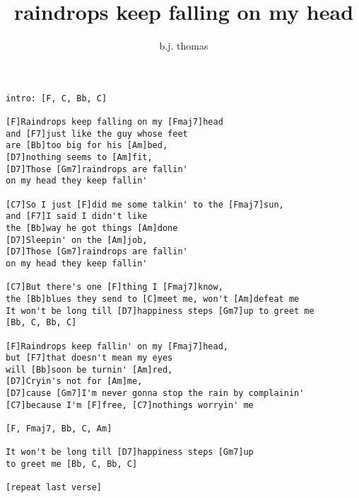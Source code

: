 \author{b.j. thomas}
\title{raindrops keep falling on my head}
\maketitle
\begin{verbatim}
intro: [F, C, Bb, C]

[F]Raindrops keep falling on my [Fmaj7]head
and [F7]just like the guy whose feet
are [Bb]too big for his [Am]bed,
[D7]nothing seems to [Am]fit,
[D7]Those [Gm7]raindrops are fallin'
on my head they keep fallin'

[C7]So I just [F]did me some talkin' to the [Fmaj7]sun,
and [F7]I said I didn't like
the [Bb]way he got things [Am]done
[D7]Sleepin' on the [Am]job,
[D7]Those [Gm7]raindrops are fallin'
on my head they keep fallin'

[C7]But there's one [F]thing I [Fmaj7]know,
the [Bb]blues they send to [C]meet me, won't [Am]defeat me
It won't be long till [D7]happiness steps [Gm7]up to greet me
[Bb, C, Bb, C]

[F]Raindrops keep fallin' on my [Fmaj7]head,
but [F7]that doesn't mean my eyes
will [Bb]soon be turnin' [Am]red,
[D7]Cryin's not for [Am]me,
[D7]cause [Gm7]I'm never gonna stop the rain by complainin'
[C7]because I'm [F]free, [C7]nothings worryin' me

[F, Fmaj7, Bb, C, Am]

It won't be long till [D7]happiness steps [Gm7]up
to greet me [Bb, C, Bb, C]

[repeat last verse]
\end{verbatim}
